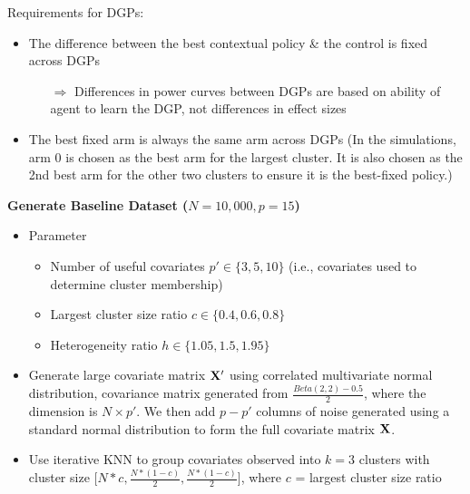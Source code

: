 \documentclass[letterpaper, 12pt, parskip=full,]{scrartcl}
\begin{document}
Requirements for DGPs:
\begin{itemize}
    \item The difference between the best contextual policy \& the control is fixed across DGPs
    \begin{itemize}
        \item[$\Rightarrow$] Differences in power curves between DGPs are based on ability of agent to learn the DGP, not differences in effect sizes
    \end{itemize}
    \item The best fixed arm is always the same arm across DGPs (In the simulations, arm 0 is chosen as the best arm for the largest cluster. It is also chosen as the 2nd best arm for the other two clusters to ensure it is the best-fixed policy.)
\end{itemize}


\textbf{Generate Baseline Dataset ($N = 10,000, p = 15$)}
\begin{itemize}
    \item Parameter \begin{itemize}
        \item Number of useful covariates $p' \in \{3, 5, 10\}$ (i.e., covariates used to determine cluster membership)
        \item Largest cluster size ratio $c \in \{0.4, 0.6, 0.8\}$
        \item Heterogeneity ratio $h \in \{1.05, 1.5, 1.95\}$
    \end{itemize}
    \item Generate large covariate matrix $\mathbf{X}'$ using correlated multivariate normal distribution, covariance matrix generated from $\frac{Beta(2,2) - 0.5}{2}$, where the dimension is $N \times p'$. We then add $p - p'$ columns of noise generated using a standard normal distribution to form the full covariate matrix $\mathbf{X}$.
    \item Use iterative KNN to group covariates observed into $k = 3$ clusters with cluster size [$N*c, \frac{N * (1-c)}{2}, \frac{N * (1-c)}{2}$], where $c$ = largest cluster size ratio
\end{itemize}
\end{document}
